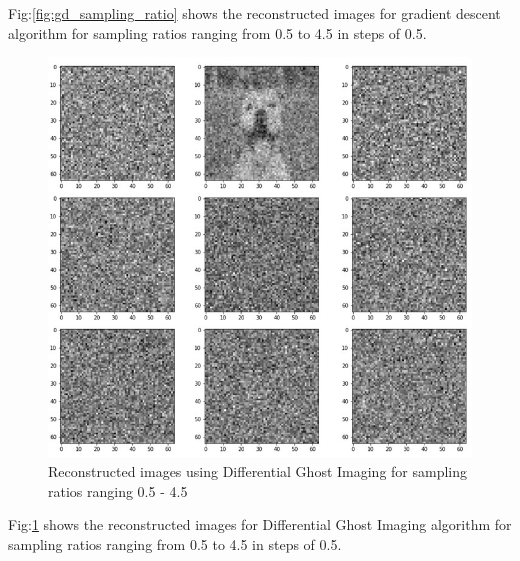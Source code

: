 \documentclass[conference]{IEEEtran}
\begin{document}
\begin{itemize}
\begin{figure}[ht]
        \end{figure}
    \par Fig:\ref{fig:gd_sampling_ratio} shows the reconstructed images for gradient descent algorithm for sampling ratios ranging from 0.5 to 4.5 in steps of 0.5.
    \bigskip
    \bigskip
    \bigskip
    \bigskip
    \begin{figure}[ht]
        \centering
        \includegraphics[scale=0.55]{figures/dgi_sampling_ratio.jpg}
        \caption{Reconstructed images using Differential Ghost Imaging for sampling ratios ranging 0.5 - 4.5}
        \label{fig:dgi_sampling_ratio}
        \end{figure}
    \par Fig:\ref{fig:dgi_sampling_ratio} shows the reconstructed images for Differential Ghost Imaging algorithm for sampling ratios ranging from 0.5 to 4.5 in steps of 0.5.
    

\end{itemize}
\end{document}
